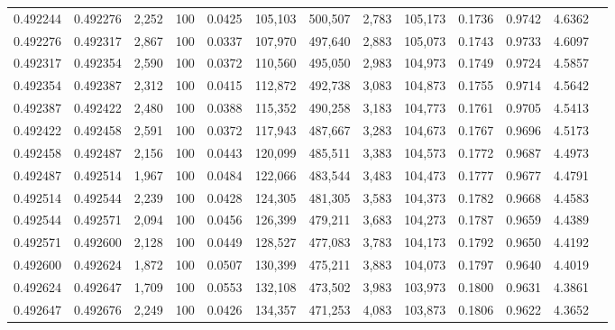 \begin{tabular}{rrrrrrrrrrrrr}
0.492244 & 0.492276 & 2,252 & 100 &                                     0.0425 & 105,103 & 500,507 &   2,783 & 105,173 & 0.1736 & 0.9742 & 4.6362 \\
0.492276 & 0.492317 & 2,867 & 100 &                                     0.0337 & 107,970 & 497,640 &   2,883 & 105,073 & 0.1743 & 0.9733 & 4.6097 \\
0.492317 & 0.492354 & 2,590 & 100 &                                     0.0372 & 110,560 & 495,050 &   2,983 & 104,973 & 0.1749 & 0.9724 & 4.5857 \\
0.492354 & 0.492387 & 2,312 & 100 &                                     0.0415 & 112,872 & 492,738 &   3,083 & 104,873 & 0.1755 & 0.9714 & 4.5642 \\
0.492387 & 0.492422 & 2,480 & 100 &                                     0.0388 & 115,352 & 490,258 &   3,183 & 104,773 & 0.1761 & 0.9705 & 4.5413 \\
0.492422 & 0.492458 & 2,591 & 100 &                                     0.0372 & 117,943 & 487,667 &   3,283 & 104,673 & 0.1767 & 0.9696 & 4.5173 \\
0.492458 & 0.492487 & 2,156 & 100 &                                     0.0443 & 120,099 & 485,511 &   3,383 & 104,573 & 0.1772 & 0.9687 & 4.4973 \\
0.492487 & 0.492514 & 1,967 & 100 &                                     0.0484 & 122,066 & 483,544 &   3,483 & 104,473 & 0.1777 & 0.9677 & 4.4791 \\
0.492514 & 0.492544 & 2,239 & 100 &                                     0.0428 & 124,305 & 481,305 &   3,583 & 104,373 & 0.1782 & 0.9668 & 4.4583 \\
0.492544 & 0.492571 & 2,094 & 100 &                                     0.0456 & 126,399 & 479,211 &   3,683 & 104,273 & 0.1787 & 0.9659 & 4.4389 \\
0.492571 & 0.492600 & 2,128 & 100 &                                     0.0449 & 128,527 & 477,083 &   3,783 & 104,173 & 0.1792 & 0.9650 & 4.4192 \\
0.492600 & 0.492624 & 1,872 & 100 &                                     0.0507 & 130,399 & 475,211 &   3,883 & 104,073 & 0.1797 & 0.9640 & 4.4019 \\
0.492624 & 0.492647 & 1,709 & 100 &                                     0.0553 & 132,108 & 473,502 &   3,983 & 103,973 & 0.1800 & 0.9631 & 4.3861 \\
0.492647 & 0.492676 & 2,249 & 100 &                                     0.0426 & 134,357 & 471,253 &   4,083 & 103,873 & 0.1806 & 0.9622 & 4.3652 \\

\end{tabular}
